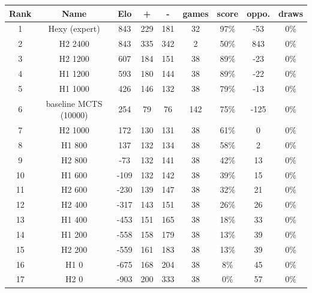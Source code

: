 \begin{table}[ht]
\small
\centering
\begin{tabular}{ c c c c c c c c c}

Rank &Name&                    Elo  &  +  &  - &games &score &oppo. &draws \\
\hline
   1& Hexy (expert)         &  843&  229&  181  &  32 &  97\%  & -53 &   0\%\\
\hline
   2& H2 2400               &  843&  335&  342  &   2 &  50\%  & 843 &   0\%\\
\hline
   3& H2 1200               &  607&  184&  151  &  38 &  89\%  & -23 &   0\%\\
\hline
   4& H1 1200               &  593&  180&  144  &  38 &  89\%  & -22  &  0\%\\
\hline
   5& H1 1000               &  426&  146&  132  &  38 &  79\%  & -13  &  0\%\\
\hline
   6& baseline MCTS (10000) &  254&   79&   76  & 142 &  75\%  &-125  &  0\%\\
\hline
   7& H2 1000               &  172&  130&  131  &  38 &  61\%  &   0  &  0\%\\
\hline
   8& H1 800                &  137&  132&  134  &  38 &  58\%  &   2  &  0\%\\
\hline
   9& H2 800                &  -73&  132&  141  &  38 &  42\%  &  13  &  0\%\\
\hline
  10& H1 600                & -109&  132&  142  &  38 &  39\%  &  15  &  0\%\\
\hline
  11& H2 600                & -230&  139&  147  &  38 &  32\%  &  21  &  0\%\\
\hline
  12& H2 400                & -317&  143&  151  &  38 &  26\%  &  26  &  0\%\\
\hline
  13& H1 400                & -453&  151&  165  &  38 &  18\%  &  33  &  0\%\\
\hline
  14& H1 200                & -558&  158&  179  &  38 &  13\%  &  39  &  0\%\\
\hline
  15& H2 200                & -559&  161&  183  &  38 &  13\%  &  39  &  0\%\\
\hline
  16& H1 0                  & -675&  168&  204  &  38 &   8\%  &  45  &  0\%\\
\hline
  17& H2 0                  & -903&  200&  333  &  38 &   0\%  &  57  &  0\%\\
  \hline
\end{tabular}
\end{table}

